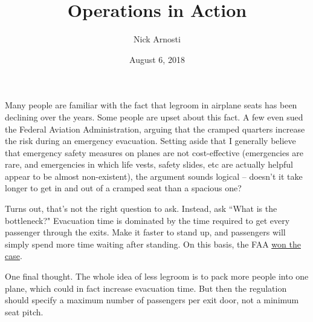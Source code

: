 \documentclass[11pt, oneside]{article}   	%
\title{\vspace{-.3 in} Operations in Action}
\author{Nick Arnosti}
\date{August 6, 2018}							%
\begin{document}
\maketitle


Many people are familiar with the fact that legroom in airplane seats has been declining over the years. Some people are upset about this fact. A few even sued the Federal Aviation Administration, arguing that the cramped quarters increase the risk during an emergency evacuation. Setting aside that I generally believe that emergency safety measures on planes are not cost-effective (emergencies are rare, and emergencies in which life vests, safety slides, etc are actually helpful appear to be almost non-existent), the argument sounds logical -- doesn't it take longer to get in and out of a cramped seat than a spacious one?

Turns out, that's not the right question to ask. Instead, ask ``What is the bottleneck?" Evacuation time is dominated by the time required to get every passenger through the exits. Make it faster to stand up, and passengers will simply spend more time waiting after standing. On this basis, the FAA {\color{blue} \underline{\href{https://www.npr.org/2018/07/05/626090518/faa-to-scrunched-passengers-sardine-seats-won-t-be-regulated}{won the case}}}.

One final thought. The whole idea of less legroom is to pack more people into one plane, which could in fact increase evacuation time. But then the regulation should specify a maximum number of passengers per exit door, not a minimum seat pitch.
\end{document}
